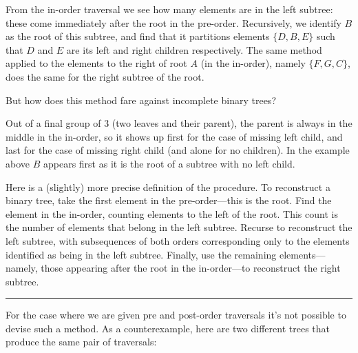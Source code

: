 \documentclass{report}
\newcommand{\okthen}{\rule[-1.4pt]{0.3em}{0.77em}}
\begin{document}
From the in-order traversal we see how many elements are in the left subtree: these come immediately after the root in the pre-order. Recursively, we identify $B$ as the root of this subtree, and find that it partitions elements $\{D,B,E\}$ such that $D$ and $E$ are its left and right children respectively. The same method applied to the elements to the right of root $A$ (in the in-order), namely $\{F,G,C\}$, does the same for the right subtree of the root.

But how does this method fare against incomplete binary trees?


Out of a final group of 3 (two leaves and their parent), the parent is always in the middle in the in-order, so it shows up first for the case of missing left child, and last for the case of missing right child (and alone for no children). In the example above %
$B$ appears first as it is the root of a subtree with no left child.

\smallskip

Here is a (slightly) more precise definition of the procedure. To reconstruct a binary tree, take the first element in the pre-order---this is the root. Find the element in the in-order, counting elements to the left of the root. This count is the number of elements that belong in the left subtree. Recurse to reconstruct the left subtree, with subsequences of both orders corresponding only to the elements identified as being in the left subtree. Finally, use the remaining elements---namely, those appearing after the root in the in-order---to reconstruct the right subtree.\ \okthen

\smallskip

For the case where we are given pre and post-order traversals it's not possible to devise such a method. As a counterexample, here are two different trees that produce the same pair of traversals:

\hspace{1cm}
\end{document}

